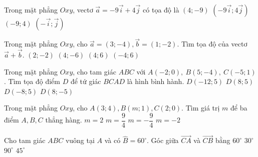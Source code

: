 \begin{ex}%
    Trong mặt phẳng $Oxy$, vectơ $\overrightarrow{a}=-9\overrightarrow{i}+4\overrightarrow{j}$ có tọa độ là
    \choice
    {$(4;-9)$}
    {$(-9\overrightarrow{i};4\overrightarrow{j})$}
    {\True $(-9;4)$}
    {$(-\overrightarrow{i};\overrightarrow{j})$}
\end{ex}

\begin{ex}%
    Trong mặt phẳng $Oxy$, cho $\overrightarrow{a}=\left(3;-4\right),\overrightarrow{b}=\left(1;-2\right)$. Tìm tọa độ của vectơ $\overrightarrow{a}+\overrightarrow{b}.$
    \choice
    {$\left(2;-2\right)$}
    {\True $\left(4;-6\right)$}
    {$\left(4;6\right)$}
    {$\left(-4;6\right)$}
\end{ex}
\begin{ex}%
    Trong mặt phẳng $Oxy$, cho tam giác $ABC$ với $A\left(-2;0\right),\ B\left(5;-4\right),\ C\left(-5;1\right)$. Tìm tọa độ điểm $D$ để tứ giác $BCAD$ là hình bình hành.
    \choice
    {$D\left(-12;5\right)$}
    {$D\left(8;5\right)$}
    {$D\left(-8;5\right)$}
    {\True $D\left(8;-5\right)$}
\end{ex}
\begin{ex}%
    Trong mặt phẳng $Oxy$, cho $A\left(3;4\right),B\left(m;1\right),C\left(2;0\right)$. Tìm giá trị $m$ để ba điểm $A,B,C$ thẳng hàng.
    \choice
    {$m=2$}
    {\True $m=\dfrac{9}{4}$}
    {$m=-\dfrac{9}{4}$}
    {$m=-2$}
\end{ex}
\begin{ex}%
    Cho tam giác $ABC$ vuông tại $A$ và có $\widehat{B}=60^\circ$. Góc giữa $\vec{CA}$ và $\vec{CB}$ bằng
    \choice
    {$60^\circ$}
    {\True $30^\circ$}
    {$90^\circ$}
    {$45^\circ$}
\end{ex}
